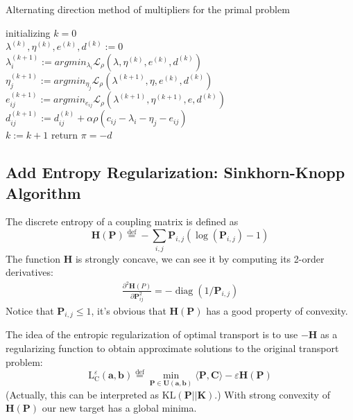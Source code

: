 \documentclass{article}
\begin{document}
\begin{algorithm}[H]
  \SetAlgoNoLine
  \caption{Alternating direction method of multipliers for the primal problem} 
  initializing $k = 0$\\
  $\lambda^{(k)},\eta^{(k)},e^{(k)},d^{(k)}:=0$\\
  {  
   $\lambda^{(k+1)}_{i}:=argmin_{\lambda_{i}}\mathcal{L}_{\rho}(\lambda,\eta^{(k)},e^{(k)},d^{(k)})$\\
   $\eta^{(k+1)}_{j}:=argmin_{\eta_{j}}\mathcal{L}_{\rho}(\lambda^{(k+1)},\eta,e^{(k)},d^{(k)})$\\
   $e^{(k+1)}_{ij}:=argmin_{e_{ij}}\mathcal{L}_{\rho}(\lambda^{(k+1)},\eta^{(k+1)},e,d^{(k)})$\\
   $d^{(k+1)}_{ij}:=d^{(k)}_{ij}+\alpha\rho(c_{ij}-\lambda_{i}-\eta_{j}-e_{ij})$\\
   $k:= k+1$
  }
  return $\pi=-d$
\end{algorithm}
\subsection{Add Entropy Regularization: Sinkhorn-Knopp Algorithm}
The discrete entropy of a coupling matrix is defined as
\begin{equation}
\mathbf { H } ( \mathbf { P } ) \stackrel { \mathrm { def } } { = } - \sum _ { i , j } \mathbf { P } _ { i , j } \left( \log \left( \mathbf { P } _ { i , j } \right) - 1 \right)
\end{equation}
The function $\mathbf{H}$ is strongly concave, we can see it by computing its 2-order derivatives:
\begin{align}
\frac{\partial ^ { 2 } \mathbf { H } ( P )}{\partial \mathbf{P}_{ij}^2} = - \operatorname { diag } \left( 1 / \mathbf { P } _ { i , j } \right)  
\end{align}
Notice that $\mathbf { P } _ { i , j } \leq 1$, it's obvious that $\mathbf { H } ( \mathbf { P } ) $ has a good property of convexity.

The idea of the entropic regularization of optimal transport is to use $-\mathbf{H}$ as a regularizing function to obtain approximate solutions to the original transport problem:
\begin{equation}
\mathrm { L } _ { \mathrm { C } } ^ { \varepsilon } ( \mathbf { a } , \mathbf { b } ) \stackrel { \mathrm { def } } { = } \min _ { \mathbf { P } \in \mathbf { U } ( \mathbf { a } , \mathbf { b } ) } \langle \mathbf { P } , \mathbf { C } \rangle - \varepsilon \mathbf { H } ( \mathbf { P } )
\label{sinkhorn target}
\end{equation}
(Actually, this can be interpreted as $\text{KL}(\mathbf{P}||\mathbf{K})$.)
With strong convexity of $\mathbf { H  ( P )}$ our new target has a global minima.
\end{document}
